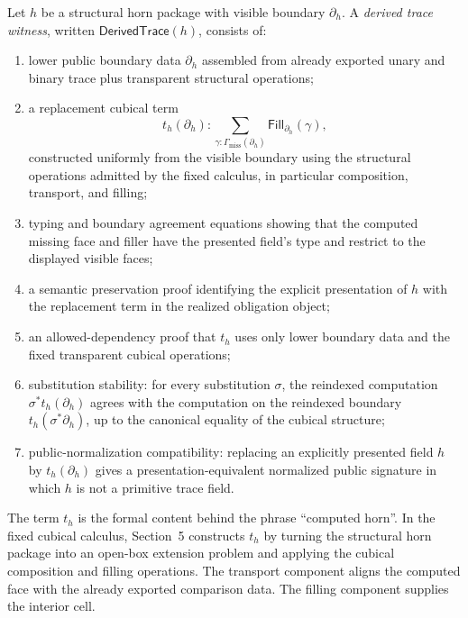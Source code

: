 \documentclass{lmcs}
\begin{document}
\begin{defi}
\label{def:derived-trace-witness}
Let \(h\) be a structural horn package with visible boundary \(\partial_h\).  A
\emph{derived trace witness}, written \(\mathsf{DerivedTrace}(h)\), consists of:
\begin{enumerate}
\item lower public boundary data \(\partial_h\) assembled from already exported unary and
binary trace plus transparent structural operations;
\item a replacement cubical term
\[
  t_h(\partial_h)
    : \sum_{\gamma:\Gamma_{\mathrm{miss}}(\partial_h)}
        \mathsf{Fill}_{\partial_h}(\gamma),
\]
constructed uniformly from the visible boundary using the structural operations admitted by
the fixed calculus, in particular composition, transport, and filling;
\item typing and boundary agreement equations showing that the computed missing face and
filler have the presented field's type and restrict to the displayed visible faces;
\item a semantic preservation proof identifying the explicit presentation of \(h\) with the
replacement term in the realized obligation object;
\item an allowed-dependency proof that \(t_h\) uses only lower boundary data and the fixed
transparent cubical operations;
\item substitution stability: for every substitution \(\sigma\), the reindexed computation
\(\sigma^*t_h(\partial_h)\) agrees with the computation on the reindexed boundary
\(t_h(\sigma^*\partial_h)\), up to the canonical equality of the cubical structure;

\item public-normalization compatibility: replacing an explicitly presented field \(h\) by
\(t_h(\partial_h)\) gives a presentation-equivalent normalized public signature in which
\(h\) is not a primitive trace field.
\end{enumerate}
\end{defi}

The term \(t_h\) is the formal content behind the phrase ``computed horn''.  In the fixed
cubical calculus, Section~5 constructs \(t_h\) by turning the structural horn package into an
open-box extension problem and applying the cubical composition and filling operations.  The
transport component aligns the computed face with the already exported comparison data.
The filling component supplies the interior cell.
\end{document}
